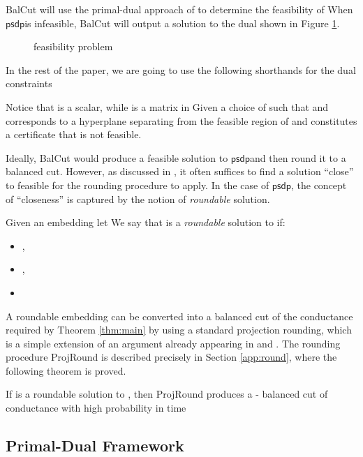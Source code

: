 \documentclass[twoside,leqno,twocolumn]{article}
\numberwithin{equation}{section}
\newcommand{\psdp}{{\ensuremath{{\mathsf{psdp}}}\xspace}}
\newcommand{\alg}{{\sc BalCut}\xspace}
\begin{document}
\noindent
\alg will use the primal-dual approach of \cite{AK} to determine the feasibility of  When \psdp is infeasible, \alg will output a solution to  the dual  shown in Figure \ref{fig:dspd}. 

\begin{figure}[htb]
 \caption{ feasibility problem}
\label{fig:dspd}
\end{figure} 
\noindent
In the rest of the paper, we are going to use the following shorthands for the dual constraints

Notice that  is a scalar, while  is a matrix in 
Given  a choice of  such that  and  corresponds to a hyperplane separating  from the feasible region of  and constitutes a certificate that  is not feasible. 

\noindent
Ideally, \alg would produce a feasible solution to \psdp and then round it to a balanced cut. However, as discussed in \cite{AK}, it often suffices to find a solution ``close'' to feasible for the rounding procedure to apply. In the case of \psdp, the concept of ``closeness'' is captured by the notion of {\it roundable} solution.
\begin{Definition}\label{def:roundable}
 Given an embedding  let  We say that  is a {\it roundable} solution to  if:
\begin{itemize}
\item ,
\item ,
\item 
\end{itemize} 
\end{Definition}

\noindent
A roundable embedding can be converted into a balanced cut of the conductance required by Theorem \ref{thm:main} by using a standard projection rounding, which is a simple extension of an argument already appearing in \cite{ARV} and \cite{AK}. The rounding procedure {\sc ProjRound} is described precisely in Section \ref{app:round}, where the following theorem is proved.
\begin{theorem}\label{thm:stdround}
If  is a roundable solution to , then {\sc ProjRound} produces a - balanced cut of conductance  with high probability in time 
\end{theorem}

\subsection{Primal-Dual Framework} \label{sec:pd}
\end{document}
